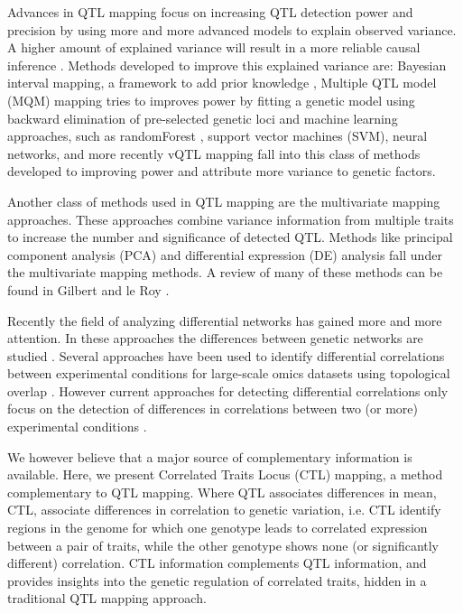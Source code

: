   Advances in QTL mapping focus on increasing QTL detection power and precision by using more and more advanced models to explain 
  observed variance. A higher amount of explained variance will result in a more reliable causal inference \cite{Li:2010}. Methods 
  developed to improve this explained variance are: Bayesian interval mapping, a framework to add prior knowledge \cite{Yandell:2007, 
  Hageman:2011}, Multiple QTL model (MQM) mapping tries to improves power by fitting a genetic model using backward elimination of 
  pre-selected genetic loci\cite{Jansen:1993, Arends:2010} and machine learning approaches, such as randomForest \cite{Bureau:2003}, 
  support vector machines (SVM), neural networks, and more recently vQTL mapping \cite{Valdar:2011} fall into this class of methods
  developed to improving power and attribute more variance to genetic factors.

  Another class of methods used in QTL mapping are the multivariate mapping approaches. These approaches combine variance information 
  from multiple traits to increase the number and significance of detected QTL. Methods like principal component analysis (PCA) and 
  differential expression (DE) analysis fall under the multivariate mapping methods. A review of many of these methods can be found 
  in Gilbert and le Roy \cite{Gilbert:2003}.

  Recently the field of analyzing differential networks has gained more and more attention. In these approaches the differences 
  between genetic networks are studied \cite{Fuente:2010,Horvath:2008}. Several approaches have been used to identify differential 
  correlations between experimental conditions for large-scale omics datasets using topological overlap \cite{Tesson:2010}. However 
  current approaches for detecting differential correlations only focus on the detection of differences in correlations between 
  two (or more) experimental conditions \cite{Fukushima:2013, Tesson:2010,Horvath:2008}. 

  We however believe that a major source of complementary information is available. Here, we present Correlated Traits Locus (CTL) 
  mapping, a method complementary to QTL mapping. Where QTL associates differences in mean, CTL, associate differences in correlation to 
  genetic variation, i.e. CTL identify regions in the genome for which one genotype leads to correlated expression between a pair of 
  traits, while the other genotype shows none (or significantly different) correlation. CTL information complements QTL information, 
  and provides insights into the genetic regulation of correlated traits, hidden in a traditional QTL mapping approach.
  
